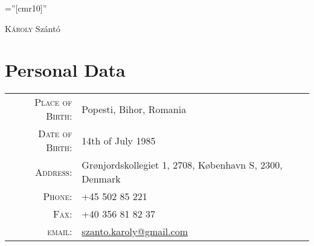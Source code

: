 \documentclass[a4paper,10pt]{article}
\begin{document}
\pagestyle{plain} %

\font\fb=''[cmr10]'' %

 
\par{\centering
		{\Huge \textsc{K\'aroly} Sz\'ant\'o
	}\bigskip\par}
	
\section{Personal Data}

\begin{tabular}{rl}
    \textsc{Place of Birth:} & Popesti, Bihor, Romania\\
    \textsc{Date of Birth:}  & 14th of July 1985 \\
    \textsc{Address:}   	 &  Grønjordskollegiet 1, 2708,
    København S, 2300, Denmark \\ 
    \textsc{Phone:}     	 & +45 502 85 221\\
    \textsc{Fax:}			 & +40 356 81 82 37\\
    \textsc{email:}     	 &
    \href{mailto:szanto.karoly@gmail.com}{szanto.karoly@gmail.com}
\end{tabular}

\end{document}
